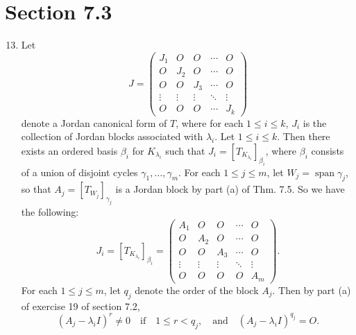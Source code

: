 \documentclass[12pt]{article}
\DeclareMathOperator{\spn}{span}
\begin{document}
\section*{Section 7.3}

\begin{enumerate}
\setcounter{enumi}{12}
\item
Let
\begin{equation} \label{eq:1}
J = \begin{pmatrix}
J_1 & O & O & \cdots & O \\
O & J_2 & O & \cdots & O \\
O & O & J_3 & \cdots & O \\
\vdots & \vdots & \vdots & \ddots & \vdots \\
O & O & O & \cdots & J_k
\end{pmatrix}
\end{equation}
denote a Jordan canonical form of $T$, where for each $1 \leq i \leq k$, $J_i$ is the collection of Jordan blocks associated with $\lambda_i$. Let $1 \leq i \leq k$. Then there exists an ordered basis $\beta_i$ for $K_{\lambda_i}$ such that $J_i = [T_{K_{\lambda_i}}]_{\beta_i}$, where $\beta_i$ consists of a union of disjoint cycles $\gamma_1, \dots, \gamma_m$. For each $1 \leq j \leq m$, let $W_j = \spn \gamma_j$, so that $A_j = [T_{W_j}]_{\gamma_j}$ is a Jordan block by part (a) of Thm. 7.5. So we have the following:
\begin{equation*}
J_i = [T_{K_{\lambda_i}}]_{\beta_i} = \begin{pmatrix}
A_1 & O & O & \cdots & O \\
O & A_2 & O & \cdots & O \\
O & O & A_3 & \cdots & O \\
\vdots & \vdots & \vdots & \ddots & \vdots \\
O & O & O & O & A_m
\end{pmatrix}.
\end{equation*}
For each $1 \leq j \leq m$, let $q_j$ denote the order of the block $A_j$. Then by part (a) of exercise 19 of section 7.2,
\begin{equation*}
(A_j - \lambda_i I)^r \neq 0 \quad \text{if} \quad 1 \leq r < q_j, \quad \text{and} \quad (A_j - \lambda_i I)^{q_j} = O.
\end{equation*}

\end{enumerate}
\end{document}
